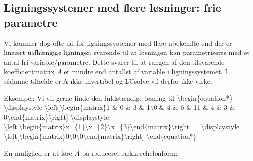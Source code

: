 \documentclass[letterpaper,10pt,english]{jupyterBook}
\begin{document}
\begin{sphinxVerbatim}[commandchars=\\\{\}]
\end{sphinxVerbatim}

\noindent{}


\subsection{Ligningssystemer med flere løsninger: frie parametre}
\label{\detokenize{notebooks/sympy/Notebook_LinAlg1:ligningssystemer-med-flere-losninger-frie-parametre}}
Vi kommer dog ofte ud for ligningssystemer med flere ubekendte end der er lineært uafhængige ligninger, svarende til at løsningen kan parametriseres med et antal fri variable/parametre. Dette svarer til at rangen af den tilsvarende koefficientmatrix \(A\) er mindre end antallet af variable i ligningssystemet.
I sådanne tilfælde er A ikke invertibel og LU\sphinxhyphen{}solve vil derfor ikke virke.

Eksempel: Vi vil gerne finde den fuldstændige løsning til
\textbackslash{}begin\{equation*\}
\textbackslash{}displaystyle \textbackslash{}left{[}\textbackslash{}begin\{matrix\}1 \& 0 \& 3 \& 1\textbackslash{}0 \& 4 \& 6 \& 1\sphinxhyphen{}1 \& 4 \& 3 \& 0\textbackslash{}end\{matrix\}\textbackslash{}right{]} \textbackslash{}displaystyle \textbackslash{}left{[}\textbackslash{}begin\{matrix\}x\_\{1\}\textbackslash{}x\_\{2\}\textbackslash{}x\_\{3\}\textbackslash{}end\{matrix\}\textbackslash{}right{]} = \textbackslash{}displaystyle \textbackslash{}left{[}\textbackslash{}begin\{matrix\}0\textbackslash{}0\textbackslash{}0\textbackslash{}end\{matrix\}\textbackslash{}right{]}
\textbackslash{}end\{equation*\}

En mulighed er at føre \(A\) på reduceret række\sphinxhyphen{}echelonform:

\begin{sphinxVerbatim}[commandchars=\\\{\}]
  \PYG{p}{[}\PYG{p}{[}   \PYG{p}{]} \PYG{p}{[}   \PYG{p}{]} \PYG{p}{[}   \PYG{p}{]}\PYG{p}{]}
\end{sphinxVerbatim}
\end{document}
